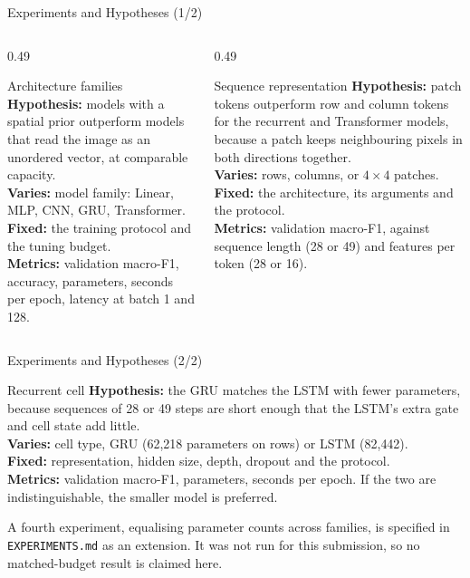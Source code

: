 \begin{frame}{Experiments and Hypotheses (1/2)}
\begin{columns}[T]
\begin{column}{0.49\textwidth}
\begin{block}{Architecture families}
\small
\textbf{Hypothesis:} models with a spatial prior outperform models that read the image as an unordered vector,
at comparable capacity.\\[2pt]
\textbf{Varies:} model family: Linear, MLP, CNN, GRU, Transformer.\\[2pt]
\textbf{Fixed:} the training protocol and the tuning budget.\\[2pt]
\textbf{Metrics:} validation macro-F1, accuracy, parameters, seconds per epoch, latency at batch 1 and 128.
\end{block}
\end{column}
\begin{column}{0.49\textwidth}
\begin{block}{Sequence representation}
\small
\textbf{Hypothesis:} patch tokens outperform row and column tokens for the recurrent and Transformer models,
because a patch keeps neighbouring pixels in both directions together.\\[2pt]
\textbf{Varies:} rows, columns, or $4 \times 4$ patches.\\[2pt]
\textbf{Fixed:} the architecture, its arguments and the protocol.\\[2pt]
\textbf{Metrics:} validation macro-F1, against sequence length (28 or 49) and features per token (28 or 16).
\end{block}
\end{column}
\end{columns}
\end{frame}

\begin{frame}{Experiments and Hypotheses (2/2)}
\begin{block}{Recurrent cell}
\small
\textbf{Hypothesis:} the GRU matches the LSTM with fewer parameters, because sequences of 28 or 49 steps are short
enough that the LSTM's extra gate and cell state add little.\\[2pt]
\textbf{Varies:} cell type, GRU (62{,}218 parameters on rows) or LSTM (82{,}442).\\[2pt]
\textbf{Fixed:} representation, hidden size, depth, dropout and the protocol.\\[2pt]
\textbf{Metrics:} validation macro-F1, parameters, seconds per epoch. If the two are indistinguishable,
the smaller model is preferred.
\end{block}

\small
A fourth experiment, equalising parameter counts across families, is specified in
\texttt{EXPERIMENTS.md} as an extension. It was not run for this submission, so no matched-budget
result is claimed here.
\end{frame}
